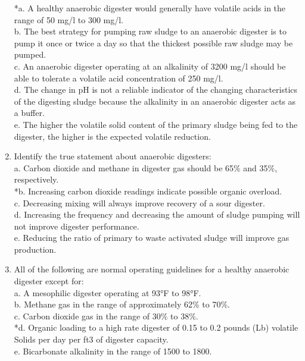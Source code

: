 \begin{enumerate}
*a. A healthy anaerobic digester would generally have volatile acids in the range of 50 mg/l to 300 mg/l. \\
b. The best strategy for pumping raw sludge to an anaerobic digester is to pump it once or twice a day so that the thickest possible raw sludge may be pumped. \\
c. An anaerobic digester operating at an alkalinity of 3200 mg/l should be able to tolerate a volatile acid concentration of 250 mg/l. \\
d. The change in pH is not a reliable indicator of the changing characteristics of the digesting sludge because the alkalinity in an anaerobic digester acts as a buffer. \\
e. The higher the volatile solid content of the primary sludge being fed to the digester, the higher is the expected volatile reduction. \\

\item  Identify the true statement about anaerobic digesters: \\

a. Carbon dioxide and methane in digester gas should be 65\% and 35\%, respectively. \\
*b. Increasing carbon dioxide readings indicate possible organic overload. \\
c. Decreasing mixing will always improve recovery of a sour digester. \\
d. Increasing the frequency and decreasing the amount of sludge pumping will not improve digester performance. \\
e. Reducing the ratio of primary to waste activated sludge will improve gas production. \\

\item  All of the following are normal operating guidelines for a healthy anaerobic digester except for: \\

a. A mesophilic digester operating at 93°F to 98°F. \\
b. Methane gas in the range of approximately 62\% to 70\%. \\
c. Carbon dioxide gas in the range of 30\% to 38\%. \\
*d. Organic loading to a high rate digester of 0.15 to 0.2 pounds (Lb) volatile Solids per day per ft3 of digester capacity. \\
e. Bicarbonate alkalinity in the range of 1500 to 1800. \\


\end{enumerate}
